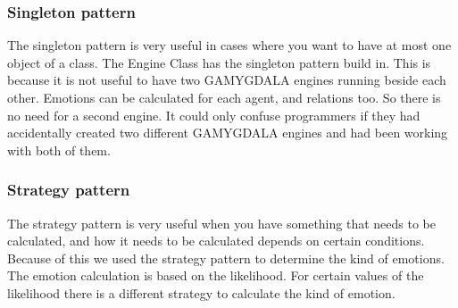 	\subsubsection{Singleton pattern}
The singleton pattern is very useful in cases where you want to have at most one object of a class. The Engine Class has the singleton pattern build in. This is because it is not useful to have two GAMYGDALA engines running beside each other. Emotions can be calculated for each agent, and relations too. So there is no need for a second engine. It could only confuse programmers if they had accidentally created two different GAMYGDALA engines and had been working with both of them.  
  
	\subsubsection{Strategy pattern}
The strategy pattern is very useful when you have something that needs to be calculated, and how it needs to be calculated depends on certain conditions. Because of this we used the strategy pattern to determine the kind of emotions. The emotion calculation is based on the likelihood. For certain values of the likelihood there is a different strategy to calculate the kind of emotion.